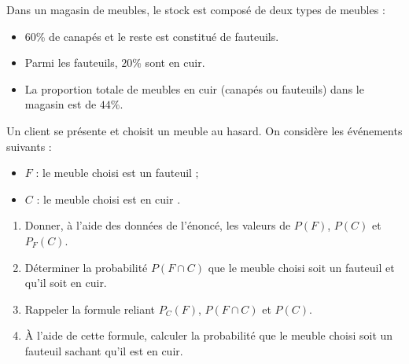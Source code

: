 \begin{exo}
	Dans un magasin de meubles, le stock est composé de deux types de meubles :
	\begin{itemize}
		\item $60$\% de canapés et le reste est constitué de fauteuils.
		\item Parmi les fauteuils, $20$\% sont en cuir.
		\item La proportion totale de meubles en cuir (canapés ou fauteuils) dans le magasin est de $44$\%.
	\end{itemize}
	Un client se présente et choisit un meuble au hasard. On considère les événements suivants :
	\begin{itemize}
		\item $F$ : \og{} le meuble choisi est un fauteuil \fg{} ;
		\item $C$ : \og{} le meuble choisi est en cuir \fg{}.
	\end{itemize}

	\begin{enumerate}
		\item Donner, à l'aide des données de l'énoncé, les valeurs de $P(F)$, $P(C)$ et $P_{F}(C)$.
		\item Déterminer la probabilité $P(F \cap C)$ que le meuble choisi soit un fauteuil et qu'il soit en cuir.
		\item Rappeler la formule reliant $P_{C}(F)$, $P(F \cap C)$ et $P(C)$.
		\item À l'aide de cette formule, calculer la probabilité que le meuble choisi soit un fauteuil sachant qu'il est en cuir.
	\end{enumerate}
\end{exo}
